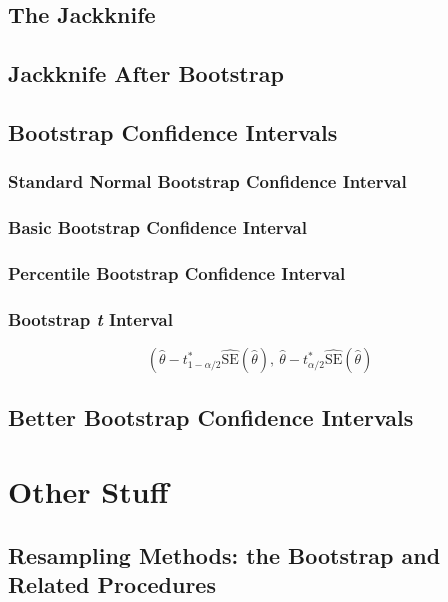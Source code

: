 \documentclass[11pt,english]{scrbook}
\begin{document}
\section{The Jackknife}
\label{sec:org7f750d1}
\section{Jackknife After Bootstrap}
\label{sec:org4519bdc}
\section{Bootstrap Confidence Intervals}
\label{sec:org7c49d9c}
\subsection{Standard Normal Bootstrap Confidence Interval}
\label{sec:org261320a}
\subsection{Basic Bootstrap Confidence Interval}
\label{sec:org6810515}
\subsection{Percentile Bootstrap Confidence Interval}
\label{sec:orgdf00e8b}
\subsection{Bootstrap \emph{t} Interval}
\label{sec:org1d6c982}
\[
\left( \hat{\theta} - t_{1 - \alpha/2}^{\ast}\widehat{\mathrm{SE}}(\hat{\theta}),\  \hat{\theta} - t_{\alpha/2}^{\ast}\widehat{\mathrm{SE}}(\hat{\theta})
\]
\section{Better Bootstrap Confidence Intervals}
\label{sec:org3150783}










\chapter{Other Stuff}
\label{sec:orgf7e4a50}


\section{Resampling Methods: the Bootstrap and Related Procedures}
\label{sec:orge2dcea1}
\end{document}
